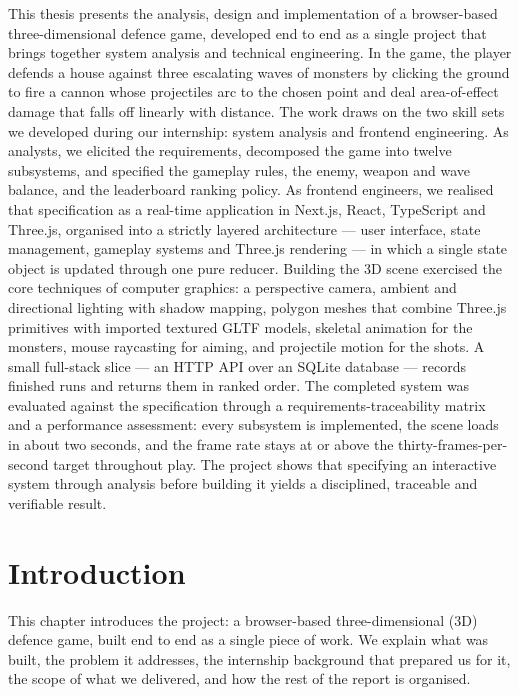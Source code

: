 \documentclass[12pt,a4paper]{report}
\begin{document}
This thesis presents the analysis, design and implementation of a browser-based
three-dimensional defence game, developed end to end as a single project that
brings together system analysis and technical engineering. In the game, the
player defends a house against three escalating waves of monsters by clicking the
ground to fire a cannon whose projectiles arc to the chosen point and deal
area-of-effect damage that falls off linearly with distance. The work draws on
the two skill sets we developed during our internship: system analysis and
frontend engineering. As analysts, we elicited the requirements, decomposed the
game into twelve subsystems, and specified the gameplay rules, the enemy, weapon
and wave balance, and the leaderboard ranking policy. As frontend engineers, we
realised that specification as a real-time application in Next.js, React,
TypeScript and Three.js, organised into a strictly layered architecture --- user
interface, state management, gameplay systems and Three.js rendering --- in which
a single state object is updated through one pure reducer. Building the 3D scene
exercised the core techniques of computer graphics: a perspective camera, ambient
and directional lighting with shadow mapping, polygon meshes that combine Three.js
primitives with imported textured GLTF models, skeletal animation for the
monsters, mouse raycasting for aiming, and projectile motion for the shots. A
small full-stack slice --- an HTTP API over an SQLite database --- records finished
runs and returns them in ranked order. The completed system was evaluated against
the specification through a requirements-traceability matrix and a performance
assessment: every subsystem is implemented, the scene loads in about two seconds,
and the frame rate stays at or above the thirty-frames-per-second target
throughout play. The project shows that specifying an interactive system through
analysis before building it yields a disciplined, traceable and verifiable
result.



\chapter{Introduction}

This chapter introduces the project: a browser-based three-dimensional (3D)
defence game, built end to end as a single piece of work. We explain what was
built, the problem it addresses, the internship background that prepared us for
it, the scope of what we delivered, and how the rest of the report is organised.
\end{document}
